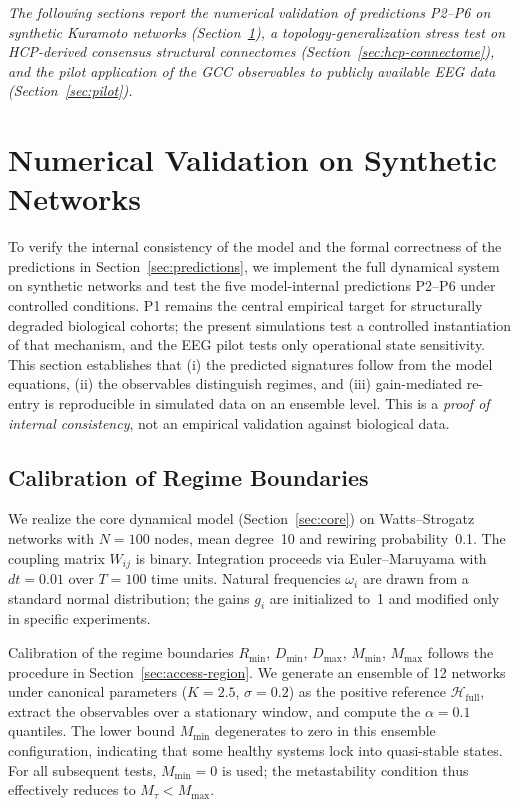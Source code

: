 \documentclass[11pt,a4paper]{article}
\theoremstyle{plain}
\theoremstyle{definition}
\theoremstyle{remark}
\begin{document}
\noindent\textit{The following sections report the numerical validation of predictions P2--P6 on synthetic Kuramoto networks (Section~\ref{sec:numerics}), a topology-generalization stress test on HCP-derived consensus structural connectomes (Section~\ref{sec:hcp-connectome}), and the pilot application of the GCC observables to publicly available EEG data (Section~\ref{sec:pilot}).}

\section{Numerical Validation on Synthetic Networks}
\label{sec:numerics}

To verify the internal consistency of the model and the formal correctness of the predictions in Section~\ref{sec:predictions}, we implement the full dynamical system on synthetic networks and test the five model-internal predictions P2--P6 under controlled conditions. P1 remains the central empirical target for structurally degraded biological cohorts; the present simulations test a controlled instantiation of that mechanism, and the EEG pilot tests only operational state sensitivity. This section establishes that (i) the predicted signatures follow from the model equations, (ii) the observables distinguish regimes, and (iii) gain-mediated re-entry is reproducible in simulated data on an ensemble level. This is a \emph{proof of internal consistency}, not an empirical validation against biological data.

\subsection{Calibration of Regime Boundaries}

We realize the core dynamical model (Section~\ref{sec:core}) on Watts--Strogatz networks with $N = 100$ nodes, mean degree~10 and rewiring probability~0.1. The coupling matrix $W_{ij}$ is binary. Integration proceeds via Euler--Maruyama with $dt = 0.01$ over $T = 100$ time units. Natural frequencies $\omega_i$ are drawn from a standard normal distribution; the gains $g_i$ are initialized to~1 and modified only in specific experiments.

Calibration of the regime boundaries $R_{\min}$, $D_{\min}$, $D_{\max}$, $M_{\min}$, $M_{\max}$ follows the procedure in Section~\ref{sec:access-region}. We generate an ensemble of 12 networks under canonical parameters ($K = 2.5$, $\sigma = 0.2$) as the positive reference $\mathcal{H}_{\mathrm{full}}$, extract the observables over a stationary window, and compute the $\alpha = 0.1$ quantiles. The lower bound $M_{\min}$ degenerates to zero in this ensemble configuration, indicating that some healthy systems lock into quasi-stable states. For all subsequent tests, $M_{\min} = 0$ is used; the metastability condition thus effectively reduces to $M_\tau < M_{\max}$.
\end{document}
